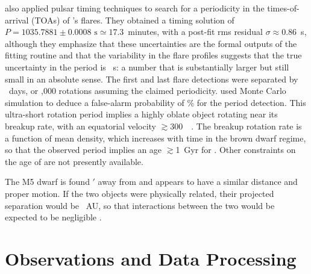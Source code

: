 \documentclass[twocolumn, times]{aastex6}
\begin{document}
\citet{rw16} also applied pulsar timing techniques to search for a periodicity
in the times-of-arrival (TOAs) of 's flares. They obtained a
timing solution of $P = 1035.7881 \pm 0.0008\text{ s} \simeq 17.3$~minutes,
with a post-fit rms residual $\sigma \approx 0.86$~s, although they emphasize
that these uncertainties are the formal outputs of the fitting routine and
that the variability in the flare profiles suggests that the true uncertainty
in the period is ~s: a number that is substantially larger but still
small in an absolute sense. The first and last flare detections were separated
by ~days, or ,000 rotations assuming the claimed periodicity.
\citet{rw16} used Monte Carlo simulation to deduce a false-alarm probability
of \% for the period detection. This ultra-short rotation period
implies a highly oblate object rotating near its breakup rate, with an
equatorial velocity $\gtrsim$300~\kms\ \citep{rw16}. The breakup rotation rate
is a function of mean density, which increases with time in the brown dwarf
regime, so that the observed period implies an age $\gtrsim$1~Gyr for
 \citep{rw16}. Other constraints on the age of  are
not presently available.

The M5 dwarf  is found $'$ away from  and
appears to have a similar distance and proper motion. If the two objects were
physically related, their projected separation would be ~AU, so that
interactions between the two would be expected to be negligible
\citep{kcg+11}.


\section{Observations and Data Processing}
\label{s.obs}
\end{document}
